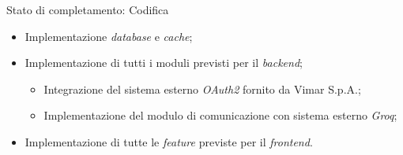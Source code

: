 \documentclass{beamer}
\begin{document}
\begin{frame}{Stato di completamento: Codifica}

  \begin{itemize}
    \item Implementazione \textit{database} e \textit{cache};
          \vspace{0.55cm}
    \item Implementazione di tutti i moduli previsti per il \textit{backend};
          \begin{itemize}
            \vspace{0.2cm}
            \item Integrazione del sistema esterno \textit{OAuth2} fornito da Vimar S.p.A.;
                  \vspace{0.2cm}

            \item Implementazione del modulo di comunicazione con sistema esterno \textit{Groq};
          \end{itemize}
          \vspace{0.55cm}
    \item Implementazione di tutte le \textit{feature} previste per il \textit{frontend}.
  \end{itemize}
\end{frame}
\end{document}

